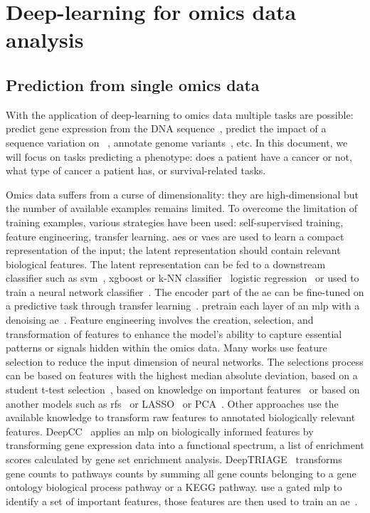 \documentclass[../main.tex]{subfiles}
\begin{document}
\chapter{Deep-learning for omics data analysis}\label{chap:sota}
\minitocpagecentered

\section{Prediction from single omics data}
	With the application of deep-learning to omics data multiple tasks are possible: predict gene expression from the DNA sequence~\cite{Avsec2021}, predict the impact of a sequence variation on ~\cite{Zeng2017}, annotate genome variants~\cite{Quang2014}, etc\@.
	In this document, we will focus on tasks predicting a phenotype: does a patient have a cancer or not, what type of cancer a patient has, or survival-related tasks.

	Omics data suffers from a curse of dimensionality: they are high-dimensional but the number of available examples remains limited.
	To overcome the limitation of training examples, various strategies have been used: self-supervised training, feature engineering, transfer learning.
	\Glspl{ae} or \glspl{vae} are used to learn a compact representation of the input; the latent representation should contain relevant biological features.
	The latent representation can be fed to a downstream classifier such as \gls{svm}~\cite{Zhang2020}, \gls{xgboost} or k-NN classifier~\cite{Arafa2023} logistic regression~\cite{Wang2018} or used to train a neural network classifier~\cite{Karim2019}.
	The encoder part of the \gls{ae} can be fine-tuned on a predictive task through transfer learning~\cite{Levy2020,Kaczmarek2022}.
	\citeauthor{Hanczar2018} pretrain each layer of an \gls{mlp} with a denoising \gls{ae}~\cite{Hanczar2018}.
	Feature engineering involves the creation, selection, and transformation of features to enhance the model's ability to capture essential patterns or signals hidden within the omics data.
	Many works use feature selection to reduce the input dimension of neural networks.
	The selections process can be based on features with the highest median absolute deviation, based on a student t-test selection~\cite{Liu2019}, based on knowledge on important features~\cite{Kaczmarek2022} or based on another models such as \glspl{rf}~\cite{Wojewodzic2021,Liu2019} or LASSO~\cite{Liu2019} or PCA~\cite{Yu2019}.
	Other approaches use the available knowledge to transform raw features to annotated biologically relevant features.
	DeepCC~\cite{gaoDeepCCNovelDeep2019} applies an \gls{mlp} on biologically informed features by transforming gene expression data into a functional spectrum, \ie{}a list of enrichment scores calculated by gene set enrichment analysis.
	DeepTRIAGE~\cite{beykikhoshkDeepTRIAGEInterpretableIndividualised2020a} transforms gene counts to pathways counts by summing all gene counts belonging to a gene ontology biological process pathway or a KEGG pathway.
	\citeauthor{Zhang2020} use a gated \gls{mlp} to identify a set of important features, those features are then used to train an \gls{ae}~\cite{Zhang2020}.
\end{document}
